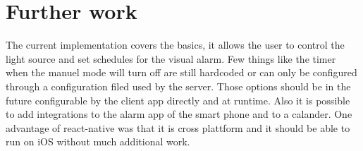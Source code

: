 \documentclass[conference]{IEEEtran}
\begin{document}
\section{Further work}


The current implementation covers the basics, it allows the user to control the light source and set schedules for the visual alarm. Few things like the timer when the manuel mode will turn off are still hardcoded or can only be configured through a configuration filed used by the server. Those options should be in the future configurable by the client app directly and at runtime. Also it is possible to add integrations to the alarm app of the smart phone and to a calander. One advantage of react-native was that it is cross plattform and it should be able to run on iOS without much additional work.









\end{document}
